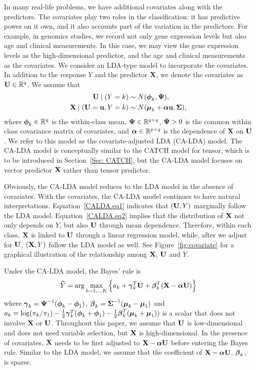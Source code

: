 In many real-life problems, we have additional covariates along with the predictors. The covariates play two roles in the classification: it has predictive power on it own, and it also accounts part of the variation in the predictors. For example, in genomics studies, we record not only gene expression levels but also age and clinical measurements. In this case, we may view the gene expression levels as the high-dimensional predictor, and the age and clinical measurements as the covariates. We consider an LDA-type model to incorporate the covariates. In addition to the response $Y$ and the predictor $\mathbf{X}$, we denote the covariates as $\mathbf{U}\in\mathbb{R}^q$. We assume that
\begin{align}
\mathbf{U}\mid(Y=k) & \sim  N(\boldsymbol{\phi}_{k},\boldsymbol{\Psi}), \label{CALDA.eq1}\\
\mathbf{X}\mid(\mathbf{U}=\mathbf{u},Y=k) & \sim  N(\boldsymbol{\mu}_{k}+\boldsymbol{\alpha} \mathbf{u},\boldsymbol{\Sigma}),\label{CALDA.eq2}
\end{align}
where $\boldsymbol{\phi}_{k}\in\mathbb{R}^{q}$ is the within-class mean, $\boldsymbol{\Psi}\in\mathbb{R}^{q\times q}$, $\boldsymbol{\Psi}>0$ is the common within class covariance matrix of covariates, and $\boldsymbol{\alpha}\in\mathbb{R}^{p\times q}$ is the dependence of $\mathbf{X}$ on $\mathbf{U}$. We refer to this model as the covariate-adjusted LDA (CA-LDA) model. The CA-LDA model is conceptually similar to the CATCH model \citep{catch} for tensor, which is to be introduced in Section~\ref{Sec: CATCH}, but the CA-LDA model focuses on vector predictor $\mathbf{X}$ rather than tensor predictor. 

Obviously, the CA-LDA model reduces to the LDA model in the absence of covariates. With the covariates, the CA-LDA model continues to have natural interpretations. Equation~\eqref{CALDA.eq1} indicates that $(\mathbf{U},Y)$ marginally follow the LDA model. Equation~\eqref{CALDA.eq2} implies that the distribution of $\mathbf{X}$ not only depends on $Y$, but also $\mathbf{U}$ through mean dependence. Therefore, within each class, $\mathbf{X}$ is linked to $\mathbf{U}$ through a linear regression model, while, after we adjust for $\mathbf{U}$, $(\mathbf{X},Y)$ follow the LDA model as well. See Figure~\ref{fig:covariate} for a graphical illustration of the relationship among $\mathbf{X}$, $\mathbf{U}$ and $Y$. 


Under the CA-LDA model, the Bayes' rule is
\begin{equation}
\widehat{Y}=\arg\max_{k=1,\dots K}\left\{ a_k+\boldsymbol{\gamma}_{k}^T\mathbf{U}+\boldsymbol{\beta}_k^T(\mathbf{X}-\boldsymbol{\alpha}\mathbf{U})\right\}
\end{equation}
where $\boldsymbol{\gamma}_k=\boldsymbol{\Psi}^{-1}(\boldsymbol{\phi}_k-\boldsymbol{\phi}_1)$, $\boldsymbol{\beta}_k=\boldsymbol{\Sigma}^{-1}(\boldsymbol{\mu}_k-\boldsymbol{\mu}_1)$ and $a_k=\log({\pi_k}/{\pi_1})-\frac{1}{2}\boldsymbol{\gamma}_k^T(\boldsymbol{\phi}_k+\boldsymbol{\phi}_1)-\frac{1}{2}\boldsymbol{\beta}_k^T(\boldsymbol{\mu}_k+\boldsymbol{\mu}_1))$ is a scalar that does not involve $\mathbf{X}$ or $\mathbf{U}$. Throughout this paper, we assume that $\mathbf{U}$ is low-dimensional and does not need variable selection, but $\mathbf{X}$ is high-dimensional. In the presence of covariates, $\mathbf{X}$ needs to be first adjusted to $\mathbf{X}-\boldsymbol{\alpha}\mathbf{U}$ before entering the Bayes rule. Similar to the LDA model, we assume that the coefficient of $\mathbf{X}-\boldsymbol{\alpha}\mathbf{U}$, $\boldsymbol{\beta}_k$, is sparse.


